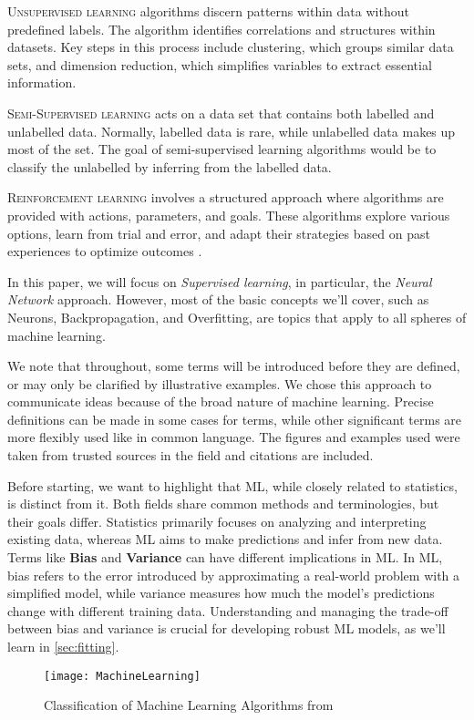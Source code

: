 \documentclass{article}
\begin{document}
\vspace{4mm}
\noindent\textsc{Unsupervised learning} algorithms discern patterns within data without predefined labels. The algorithm identifies correlations and structures within datasets. Key steps in this process include clustering, which groups similar data sets, and dimension reduction, which simplifies variables to extract essential information. 

\vspace{4mm}
\noindent\textsc{Semi-Supervised learning} acts on a data set that contains both labelled and unlabelled data. Normally, labelled data is rare, while unlabelled data makes up most of the set. The goal of semi-supervised learning algorithms would be to classify the unlabelled by inferring from the labelled data.

\vspace{4mm}
\noindent\textsc{Reinforcement learning} involves a structured approach where algorithms are provided with actions, parameters, and goals. These algorithms explore various options, learn from trial and error, and adapt their strategies based on past experiences to optimize outcomes \citep{GuideML}.

\vspace{4mm}
In this paper, we will focus on \textit{Supervised learning}, in particular, the \textit{Neural Network} approach. However, most of the basic concepts we'll cover, such as Neurons, Backpropagation, and Overfitting, are topics that apply to all spheres of machine learning.

We note that throughout, some terms will be introduced before they are defined, or may only be clarified by illustrative examples. We chose this approach to communicate ideas because of the broad nature of machine learning. Precise definitions can be made in some cases for terms, while other significant terms are more flexibly used like in common language. The figures and examples used were taken from trusted sources in the field and citations are included. 

Before starting, we want to highlight that ML, while closely related to statistics, is distinct from it. Both fields share common methods and terminologies, but their goals differ. Statistics primarily focuses on analyzing and interpreting existing data, whereas ML aims to make predictions and infer from new data. Terms like \textbf{Bias} and \textbf{Variance} can have different implications in ML. In ML, bias refers to the error introduced by approximating a real-world problem with a simplified model, while variance measures how much the model's predictions change with different training data. Understanding and managing the trade-off between bias and variance is crucial for developing robust ML models, as we'll learn in \autoref{sec:fitting}.
\begin{figure}
  \texttt{[image: MachineLearning]}
  \caption{Classification of Machine Learning Algorithms from \cite{SurveyML}}
  \label{fig:ML}
\end{figure}
\end{document}
